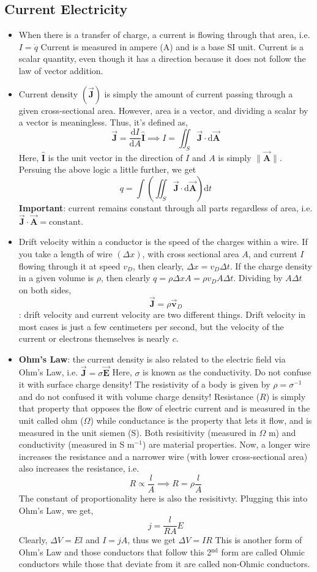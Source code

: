 \documentclass{scrartcl}
\begin{document}
    \subsection{Current Electricity}
    \begin{itemize}
        \item When there is a transfer of charge, a current is flowing through that area, i.e. $\boxed{I=\dot q}$ Current is measured in ampere (A) and is a base SI unit. Current is a scalar quantity, even though it has a direction because it does not follow the law of vector addition.
        \item Current density $\left(\vec{\mathbf J}\right)$ is simply the amount of current passing through a given cross-sectional area. However, area is a vector, and dividing a scalar by a vector is meaningless. Thus, it's defined as, \[\vec{\mathbf J}=\frac{\mathrm dI}{\mathrm dA}\hat{\mathbf I}\implies I=\iint_S\vec{\mathbf J}\cdot\mathrm d\vec{\mathbf A}\] Here, $\hat{\mathbf I}$ is the unit vector in the direction of $I$ and $A$ is simply $\|\vec{\mathbf A}\|$. Persuing the above logic a little further, we get \[\boxed{q=\int\left(\iint_S\vec{\mathbf J}\cdot\mathrm d\vec{\mathbf A}\right)\mathrm dt}\] \textbf{Important}: current remains constant through all parts regardless of area, i.e. $\vec{\mathbf J}\cdot\vec{\mathbf A}=\textrm{constant}$.
        \item Drift velocity within a conductor is the speed of the charges within a wire. If you take a length of wire $\left(\Delta x\right)$, with cross sectional area $A$, and current $I$ flowing through it at speed $v_D$, then clearly, $\Delta x=v_D\Delta t$. If the charge density in a given volume is $\rho$, then clearly $q=\rho\Delta xA=\rho v_DA\Delta t$. Dividing by $A\Delta t$ on both sides, \[\boxed{\vec{\mathbf J}=\rho\vec{\mathbf v}_D}\] : drift velocity and current velocity are two different things. Drift velocity in most cases is just a few centimeters per second, but the velocity of the current or electrons themselves is nearly $c$.
        \item \textbf{Ohm's Law}: the current density is also related to the electric field via Ohm's Law, i.e. $\boxed{\vec{\mathbf J}=\sigma\vec{\mathbf E}}$ Here, $\sigma$ is known as the conductivity. Do not confuse it with surface charge density! The resistivity of a body is given by $\rho=\sigma^{-1}$ and do not confused it with volume charge density! Resistance ($R$) is simply that property that opposes the flow of electric current and is measured in the unit called ohm ($\Omega$) while conductance is the property that lets it flow, and is measured in the unit siemen (S). Both resisitivity (measured in $\Omega$ m) and conductivity (measured in S m$^{-1}$) are material properties. Now, a longer wire increases the resistance and a narrower wire (with lower cross-sectional area) also increases the resistance, i.e. \[R\propto\frac lA\implies R=\rho\frac lA\] The constant of proportionality here is also the resisitivty. Plugging this into Ohm's Law, we get, \[j=\frac l{RA}E\] Clearly, $\Delta V=El$ and $I=jA$, thus we get $\boxed{\Delta V=IR}$ This is another form of Ohm's Law and those conductors that follow this 2$^\text{nd}$ form are called Ohmic conductors while those that deviate from it are called non-Ohmic conductors.

\end{itemize}
\end{document}
